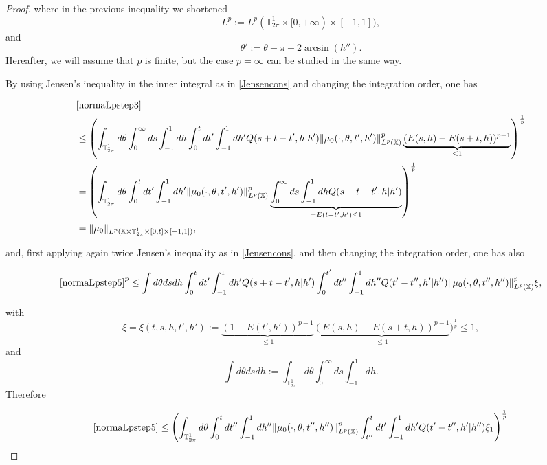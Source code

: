\documentclass[10pt,a4paper]{amsart}
\begin{document}
\begin{proof}
where in the previous inequality we shortened
\[
L^p:=L^p(\mathbb{T}^1_{2\pi}\times[0,+\infty)\times[-1,1]),
\]
and
\[
\theta':=\theta+\pi-2\arcsin(h'').
\]
Hereafter, we will assume that $p$ is finite, but the case $p=\infty$ can be studied in the same way.

By using Jensen's inequality in the inner integral as in \eqref{Jensencons} and changing the integration order, one has

{\tiny\begin{align*}
&\eqref{normaLpstep3}
\\
&\leq\left(\int_{\mathbb{T}^1_{2\pi}}d\theta\int_0^{\infty}ds\int_{-1}^1dh\int_0^tdt'\int_{-1}^1dh'Q(s+t-t',h|h')\|\mu_0(\cdot,\theta,t',h')\|_{L^p(\mathbb{X})}^p\underbrace{(E(s,h)-E(s+t,h))^{p-1}}_{\leq1}\right)^{\frac{1}{p}}
\\
&=\left(\int_{\mathbb{T}^1_{2\pi}}d\theta\int_0^tdt'\int_{-1}^1dh'\|\mu_0(\cdot,\theta,t',h')\|_{L^p(\mathbb{X})}^p\underbrace{\int_0^{\infty}ds\int_{-1}^1dhQ(s+t-t',h|h')}_{=E(t-t',h')\leq1}\right)^{\frac{1}{p}}
\\
&=\|\mu_0\|_{L^p(\mathbb{X}\times\mathbb{T}^1_{2\pi}\times[0,t]\times[-1,1])},
\end{align*}}

and, first applying again twice Jensen's inequality as in \eqref{Jensencons}, and then changing the integration order, one has also

{\tiny\begin{align*}
\eqref{normaLpstep5}^p\leq\int d\theta dsdh\int_0^tdt'\int_{-1}^1dh'Q(s+t-t',h|h')\int_0^{t'}dt''\int_{-1}^1dh''Q(t'-t'',h'|h'')\|\mu_0(\cdot,\theta,t'',h'')\|_{L^p(\mathbb{X})}^p\xi,
\end{align*}}

with
\[
\xi=\xi(t,s,h,t',h'):=\underbrace{(1-E(t',h'))^{p-1}}_{\leq1}\underbrace{(E(s,h)-E(s+t,h))^{p-1}}_{\leq 1})^{\frac{1}{p}}\leq1,
\]
and
\[
\int d\theta dsdh:=\int_{\mathbb{T}^1_{2\pi}}d\theta\int_0^{\infty}ds\int_{-1}^1dh.
\]
Therefore

{\small\begin{align*}
\eqref{normaLpstep5}\leq\left(\int_{\mathbb{T}^1_{2\pi}}d\theta\int_0^tdt''\int_{-1}^1dh''\|\mu_0(\cdot,\theta,t'',h'')\|_{L^p(\mathbb{X})}^p\int_{t''}^tdt'\int_{-1}^1dh'Q(t'-t'',h'|h'')\xi_1\right)^{\frac{1}{p}}
\end{align*}}


\end{proof}
\end{document}
